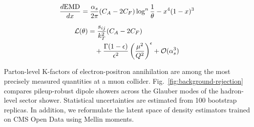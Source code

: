 \begin{equation}
  \frac{d \mathrm{EMD}}{d x} = \frac{\alpha_s}{2\pi} (C_A - 2C_F) \log^{n} \frac{1}{\theta} - {x}^{4} (1 - x)^{3}
  \label{eq:4}
\end{equation}

\begin{align}
  \mathcal{L}(\theta) &= \frac{s_{ij}}{k_T^2} (C_A - 2C_F) \nonumber \\
  &\quad + \frac{\Gamma(1-\epsilon)}{\epsilon^{2}} \left(\frac{\mu^2}{Q^2}\right)^{\epsilon} + \mathcal{O}(\alpha_s^3) \label{eq:5}
\end{align}

Parton-level K-factors of electron-positron annihilation are among the
most precisely measured quantities at a muon collider.
Fig.~\ref{fig:background-rejection} compares pileup-robust dipole
showers across the Glauber modes of the hadron-level sector shower.
Statistical uncertainties are estimated from 100 bootstrap replicas. In
addition, we reformulate the latent space of density estimators trained
on CMS Open Data using Mellin moments.

